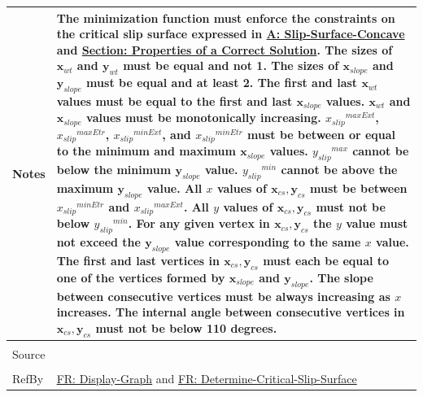 \documentclass[12pt]{article}
\begin{document}
\begin{minipage}{\textwidth}
\begin{tabular}{>{\raggedright}p{}>{\raggedright\arraybackslash}p{}}
Notes & The minimization function must enforce the constraints on the critical slip surface expressed in \hyperref[assumpSSC]{A: Slip-Surface-Concave} and \hyperref[Sec:CorSolProps]{Section: Properties of a Correct Solution}. The sizes of ${\mathbf{x}_{wt}}$ and ${\mathbf{y}_{wt}}$ must be equal and not 1. The sizes of ${\mathbf{x}_{slope}}$ and ${\mathbf{y}_{slope}}$ must be equal and at least 2. The first and last ${\mathbf{x}_{wt}}$ values must be equal to the first and last ${\mathbf{x}_{slope}}$ values. ${\mathbf{x}_{wt}}$ and ${\mathbf{x}_{slope}}$ values must be monotonically increasing. ${{x_{slip}}^{maxExt}}$, ${{x_{slip}}^{maxEtr}}$, ${{x_{slip}}^{minExt}}$, and ${{x_{slip}}^{minEtr}}$ must be between or equal to the minimum and maximum ${\mathbf{x}_{slope}}$ values. ${{y_{slip}}^{max}}$ cannot be below the minimum ${\mathbf{y}_{slope}}$ value. ${{y_{slip}}^{min}}$ cannot be above the maximum ${\mathbf{y}_{slope}}$ value. All $x$ values of ${\mathbf{x}_{cs}},{\mathbf{y}_{cs}}$ must be between ${{x_{slip}}^{minEtr}}$ and ${{x_{slip}}^{maxExt}}$. All $y$ values of ${\mathbf{x}_{cs}},{\mathbf{y}_{cs}}$ must not be below ${{y_{slip}}^{min}}$. For any given vertex in ${\mathbf{x}_{cs}},{\mathbf{y}_{cs}}$ the $y$ value must not exceed the ${\mathbf{y}_{slope}}$ value corresponding to the same $x$ value. The first and last vertices in ${\mathbf{x}_{cs}},{\mathbf{y}_{cs}}$ must each be equal to one of the vertices formed by ${\mathbf{x}_{slope}}$ and ${\mathbf{y}_{slope}}$. The slope between consecutive vertices must be always increasing as $x$ increases. The internal angle between consecutive vertices in ${\mathbf{x}_{cs}},{\mathbf{y}_{cs}}$ must not be below 110 degrees.
        
\\ \midrule \\
Source & \cite{li2010}
         
\\ \midrule \\
RefBy & \hyperref[displayGraph]{FR: Display-Graph} and \hyperref[determineCritSlip]{FR: Determine-Critical-Slip-Surface}
        
\\ \bottomrule
\end{tabular}
\end{minipage}
\end{document}
